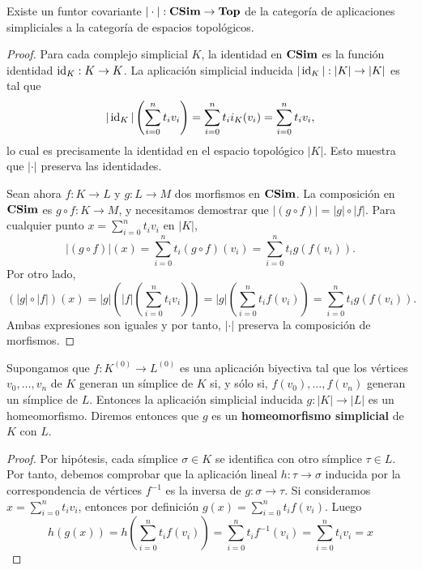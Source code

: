 \begin{proposicion}
	Existe un funtor covariante $|\cdot| : \mathbf{CSim}\to \mathbf{Top}$ de la categoría
	de aplicaciones simpliciales a la categoría de espacios topológicos.
\end{proposicion}
\begin{proof}
	Para cada complejo simplicial $K$, la identidad en $\mathbf{CSim}$ es la función
	identidad $\operatorname{id}_{K} : K \to K$. La aplicación simplicial inducida $|\operatorname{id}_{K}| : |
	K| \to |K|$ es tal que
	\[
	|\operatorname{id}_{K}|\left(\sum_{i=0}^{n}t_{i} v_{i}\right) = \sum_{i=0}^{n}t_{i} i_{K}(v
	_{i}) = \sum_{i=0}^{n}t_{i} v_{i},
	\]
	lo cual es precisamente la identidad en el espacio topológico $|K|$. Esto
	muestra que $|\cdot|$ preserva las identidades.
	
	Sean ahora $f: K \to L$ y $g: L \to M$ dos morfismos en $\mathbf{CSim}$. La composición
	en $\mathbf{CSim}$ es $g \circ f: K \to M$, y necesitamos demostrar que
	$|(g \circ f)| = |g| \circ |f|$. Para cualquier punto $x = \sum_{i=0}^{n}t_{i}
	v_{i}$ en $|K|$,
	\[
	|(g \circ f)|(x) = \sum_{i=0}^{n}t_{i} (g \circ f)(v_{i}) = \sum_{i=0}^{n}t_{i}
	g(f(v_{i})).
	\]
	Por otro lado,
	\[
	(|g| \circ |f|)(x) = |g|\left(|f|\left(\sum_{i=0}^{n}t_{i} v_{i}\right)\right
	) = |g|\left(\sum_{i=0}^{n}t_{i} f(v_{i})\right) = \sum_{i=0}^{n}t_{i} g(f(v_{i}
	)).
	\]
	Ambas expresiones son iguales y por tanto, $|\cdot|$ preserva la composición
	de morfismos.
\end{proof}

\begin{lema}
	\label{lem:homeo_complex} Supongamos que $f:K^{(0)}\rightarrow L^{(0)}$ es una
	aplicación biyectiva tal que los vértices $v_{0}, \ldots, v_{n}$ de $K$ generan
	un símplice de $K$ si, y sólo si, $f(v_{0}), \ldots, f(v_{n})$ generan un símplice
	de $L$. Entonces la aplicación simplicial inducida $g:|K| \rightarrow |L|$ es
	un homeomorfismo. Diremos entonces que $g$ es un \textbf{homeomorfismo
		simplicial} de $K$ con $L$.
\end{lema}
\begin{proof}
	Por hipótesis, cada símplice $\sigma \in K$ se identifica con otro símplice
	$\tau \in L$. Por tanto, debemos comprobar que la aplicación lineal
	$h: \tau \rightarrow \sigma$ inducida por la correspondencia de vértices
	$f^{-1}$ es la inversa de $g: \sigma \rightarrow \tau$. Si consideramos $x = \sum
	_{i=0}^{n}t_{i}v_{i}$, entonces por definición
	$g(x) = \sum_{i=0}^{n}t_{i}f(v_{i})$. Luego
	\[
	h(g(x)) = h(\sum_{i=0}^{n}t_{i}f(v_{i})) = \sum_{i=0}^{n}t_{i}f^{-1}(v_{i}) =
	\sum_{i=0}^{n}t_{i}v_{i}= x
	\]
\end{proof}

